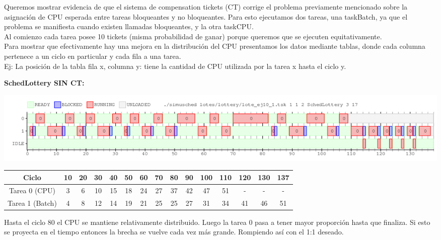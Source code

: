 Queremos mostrar evidencia de que el sistema de compensation tickets (CT) corrige el problema
previamente mencionado sobre la asignación de CPU esperada entre tareas bloqueantes y no bloqueantes.
Para esto ejecutamos dos tareas, una taskBatch, ya que el problema se manifiesta cuando existen llamadas bloqueantes, y la otra taskCPU.\\

Al comienzo cada tarea posee 10 tickets (misma probabilidad de ganar) porque queremos que se ejecuten equitativamente.\\
Para mostrar que efectivamente hay una mejora en la distribución del CPU presentamos los datos mediante tablas, donde cada columna pertenece a un ciclo en particular 
y cada fila a una tarea.\\
Ej: La posición de la tabla fila x, columna y: tiene la cantidad de CPU utilizada por la tarea x hasta el ciclo y.\\

\begin{flushleft}
\textbf{SchedLottery SIN CT:}\end{flushleft} %

\begin{center}
 \includegraphics[scale=0.48]{./Lottery/ej10_SIN_CT.png}
\end{center}

\begin{center}
\begin{tabular}{|c|c|c|c|c|c|c|c|c|c|c|c|c|c|c|}
\hline
Ciclo & 10 & 20 & 30 & 40 & 50 & 60 & 70 & 80 & 90 & 100 & 110 & 120 & 130 & 137\\
\hline
\hline
Tarea 0 (CPU) & 3 & 6 & 10 & 15 & 18 & 24 & 27 & 37 & 42 & 47 & 51 & - & - & - \\
\hline
Tarea 1 (Batch) & 4 & 8 & 12 & 14 & 19 & 21 & 25 & 25 & 27 & 31 & 34 & 41 & 46 & 51 \\
\hline
\end{tabular}\end{center}

Hasta el ciclo 80 el CPU se mantiene relativamente distribuido. Luego la tarea 0 pasa a tener mayor proporción hasta que finaliza. 
Si esto se proyecta en el tiempo entonces la brecha se vuelve cada vez más grande. Rompiendo así con el 1:1 deseado.

